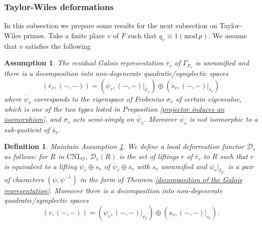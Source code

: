 \documentclass[12pt,oneside,reqno]{amsart}
\theoremstyle{plain}
\newtheorem{definition}[theorem]{Definition}
\newtheorem{assumption}[theorem]{Assumption}
\begin{document}
	
	
	
	
	
	
	
	
	
	
	
	
	
	
	
	
	
	
	
	
	
	
	
	
	
	
	
	
	
	
	
	
	
	
	
	
	
	
	
	
	\subsubsection{Taylor-Wiles deformations}
	In this subsection we prepare some results for 
	the next subsection on Taylor-Wiles primes.
	Take a finite place
	$v$ of $F$ such that
	$q_v\equiv1
	(\mathrm{mod}\,p)$.
	We assume that $v$ satisfies the following
	\begin{assumption}\label{assumption on Taylor-Wiles deformations-Thorne}
		The residual Galois representation
		$\overline{r}_v$
		of
		$\Gamma_{F_v}$
		is unramified
		and
		there is a decomposition into non-degenerate quadratic/symplectic spaces
		\[
		(\overline{r}_v,(-,-))
		=
		(\overline{\psi}_v,(-,-)|_{\overline{\psi}_v})
		\oplus
		(\overline{s}_v,(-,-)|_{\overline{s}_v})
		\]
		where
		$\overline{\psi}_v$
		corresponds
		to the eigenspace of
		Frobenius $\sigma_v$
		of certain eigenvalue,
		which is one of the two types listed in
		Proposition
		\ref{projector induces an isomorphism},
		and
		$\sigma_v$
		acts semi-simply on
		$\overline{\psi}_v$.
		Moreover
		$\overline{\psi}_v$
		is not isomorphic to a sub-quotient of
		$\overline{s}_v$.
	\end{assumption}
	
	
	
	
	
	
	\begin{definition}\label{Taylor-Wiles deformations-Thorne}
		Maintain Assumption \ref{assumption on Taylor-Wiles deformations-Thorne}. We define a local deformation functor
		$\mathcal{D}_v$
		as follows:
		for
		$R$ in
		$\mathrm{CNL}_\mathcal{O}$,
		$\mathcal{D}_v(R)$
		is the set of liftings
		$r$ of
		$\overline{r}_v$
		to
		$R$
		such that
		$r$
		is equivalent to
		a lifting
		$\psi_v\oplus s_v$
		of
		$\overline{\psi}_v\oplus\overline{s}_v$
		with
		$s_v$
		unramified
		and
		$\psi_v | _{I_{F_v}}$
		is a pair of
		characters
		$(\psi,\psi^{-1})$
		in the form of
		Theorem
		\ref{decomposition of the Galois representation}.
		Moreover there is a decomposition into non-degenerate quadratic/symplectic spaces
		\[
		(r,(-,-))=(\psi_v,(-,-)|_{\psi_v})\oplus(s_v,(-,-)|_{s_v}).
		\]
	\end{definition}
	
\end{document}
